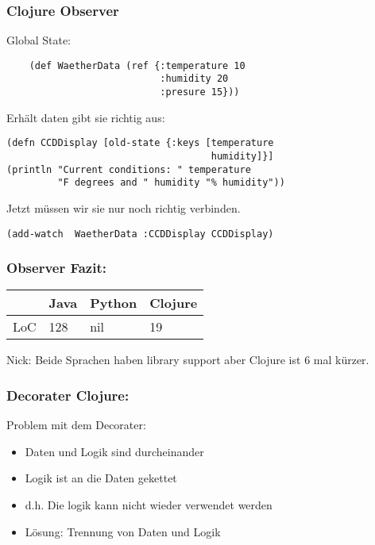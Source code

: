 \documentclass[compress, blue]{beamer}
\begin{document}
\begin{frame}[fragile]\frametitle{Clojure Observer}

Global State:
  \begin{lstlisting}
    (def WaetherData (ref {:temperature 10 
                           :humidity 20 
                           :presure 15}))
  \end{lstlisting}
\pause
Erhält daten gibt sie richtig aus:
\pause
\begin{lstlisting}
(defn CCDDisplay [old-state {:keys [temperature 
                                    humidity]}]
(println "Current conditions: " temperature 
         "F degrees and " humidity "% humidity"))
\end{lstlisting}
\pause
Jetzt müssen wir sie nur noch richtig verbinden.
\pause
\begin{lstlisting}
(add-watch  WaetherData :CCDDisplay CCDDisplay)
\end{lstlisting}
\end{frame}






\begin{frame}\frametitle{Observer Fazit:}
   \begin{tabular}{l | l l l}
     & Java &  Python & Clojure  \\
     \hline
    LoC & 128 &  nil & 19  \\
   \end{tabular}

  \begin{block}{Nick:}
    Beide Sprachen haben library support aber Clojure ist 6 mal kürzer.
  \end{block}
\end{frame}



\begin{frame}\frametitle{Decorater Clojure:}
  \begin{block}{Problem mit dem Decorater:}
    \begin{itemize}
    \item Daten und Logik sind durcheinander
    \item Logik ist an die Daten gekettet
    \item d.h. Die logik kann nicht wieder verwendet werden
    \item Lösung: Trennung von Daten und Logik
    \end{itemize}
  \end{block}
\end{frame}
\end{document}
